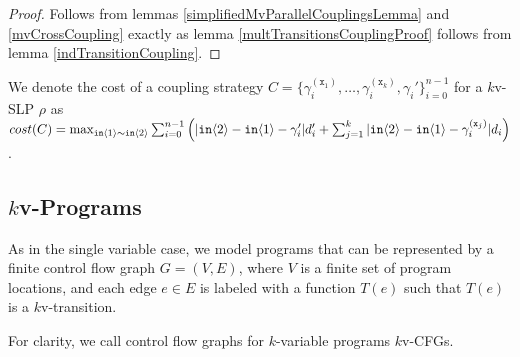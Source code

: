 \begin{proof}
    Follows from lemmas \ref{simplifiedMvParallelCouplingsLemma} and \ref{mvCrossCoupling} exactly as lemma \ref{multTransitionsCouplingProof} follows from lemma \ref{indTransitionCoupling}.
\end{proof}

We denote the cost of a coupling strategy $C=\{\gamma_i^{(\texttt{x}_1)},\ldots, \gamma_i^{(\texttt{x}_k)}, \gamma_i'\}_{i=0}^{n-1}$ for a $k$v-SLP $\rho$ as $cost(C) = \max_{\texttt{in}\langle1 \rangle\sim\texttt{in}\langle2 \rangle}\sum_{i=0}^{n-1}\left(|\texttt{in}\langle2 \rangle-\texttt{in}\langle1 \rangle-\gamma_i'|d_i'+\sum_{j=1}^k|\texttt{in}\langle2 \rangle-\texttt{in}\langle1 \rangle-\gamma_i^{(\texttt{x}_j)}|d_i\right)$.

\subsection{$k$v-Programs}

As in the single variable case, we model programs that can be represented by a finite control flow graph $G = (V, E)$, where $V$ is a finite set of program locations, and each edge $e\in E$ is labeled with a function $T(e)$ such that $T(e)$ is a $k$v-transition. 

For clarity, we call control flow graphs for $k$-variable programs $k$v-CFGs. 

